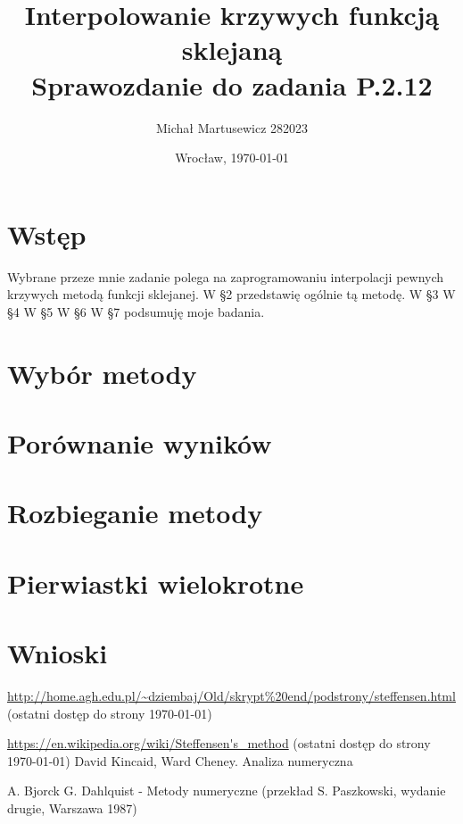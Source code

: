 \documentclass{article}
\author{Michał Martusewicz 282023}
\date{Wrocław, \today}
\title{\textbf{Interpolowanie krzywych funkcją sklejaną}  \\ Sprawozdanie do zadania P.2.12}
\begin{document}
\maketitle
\section{Wstęp}

Wybrane przeze mnie zadanie polega na zaprogramowaniu interpolacji pewnych krzywych metodą funkcji sklejanej.
 W \S 2 przedstawię ogólnie tą metodę.
 W \S 3 
 W \S 4 
 W \S 5 
 W \S 6 
 W \S 7 podsumuję moje badania.
 

\section{Wybór metody}

\section{}

\section{Porównanie wyników}


\section{Rozbieganie metody}


\section{Pierwiastki wielokrotne}

\section{Wnioski}



\begin{thebibliography}{9}
	\itemsep2pt
	 \url{http://home.agh.edu.pl/~dziembaj/Old/skrypt%20end/podstrony/steffensen.html}
	(ostatni dostęp do strony \today)
	
	 \url{https://en.wikipedia.org/wiki/Steffensen's_method}
	(ostatni dostęp do strony \today)
     David Kincaid, Ward Cheney. Analiza numeryczna 

    A. Bjorck G. Dahlquist - Metody numeryczne (przekład S. Paszkowski, wydanie drugie, Warszawa 1987)
    
		
\end{thebibliography}
\end{document}
